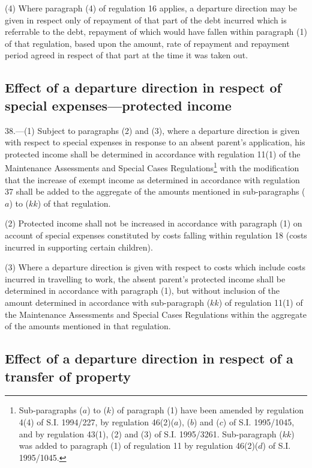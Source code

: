 \documentclass[a4paper]{article}
\begin{document}
(4) Where paragraph (4) of regulation 16 applies, a departure direction may be given in respect only of repayment of that part of the debt incurred which is referrable to the debt, repayment of which would have fallen within paragraph (1) of that regulation, based upon the amount, rate of repayment and repayment period agreed in respect of that part at the time it was taken out.

\subsection[38. Effect of a departure direction in respect of special expenses—protected income]{Effect of a departure direction in respect of special expenses—\hspace{0pt}protected income}

38.—(1) Subject to paragraphs (2) and (3), where a departure direction is given with respect to special expenses in response to an absent parent’s application, his protected income shall be determined in accordance with regulation 11(1) of the Maintenance Assessments and Special Cases Regulations\footnote{\frenchspacing Sub-paragraphs ($a$) to ($k$) of paragraph (1) have been amended by regulation 4(4) of S.I. 1994/227, by regulation 46(2)($a$), ($b$) and ($c$) of S.I. 1995/1045, and by regulation 43(1), (2) and (3) of S.I. 1995/3261. Sub-paragraph ($kk$) was added to paragraph (1) of regulation 11 by regulation 46(2)($d$) of S.I. 1995/1045.} with the modification that the increase of exempt income as determined in accordance with regulation 37 shall be added to the aggregate of the amounts mentioned in sub-paragraphs ($a$) to ($kk$) of that regulation.

(2) Protected income shall not be increased in accordance with paragraph (1) on account of special expenses constituted by costs falling within regulation 18 (costs incurred in supporting certain children).

(3) Where a departure direction is given with respect to costs which include costs incurred in travelling to work, the absent parent’s protected income shall be determined in accordance with paragraph (1), but without inclusion of the amount determined in accordance with sub-paragraph ($kk$) of regulation 11(1) of the Maintenance Assessments and Special Cases Regulations within the aggregate of the amounts mentioned in that regulation.

\subsection[39. Effect of a departure direction in respect of a transfer of property]{Effect of a departure direction in respect of a transfer of property}
\end{document}
